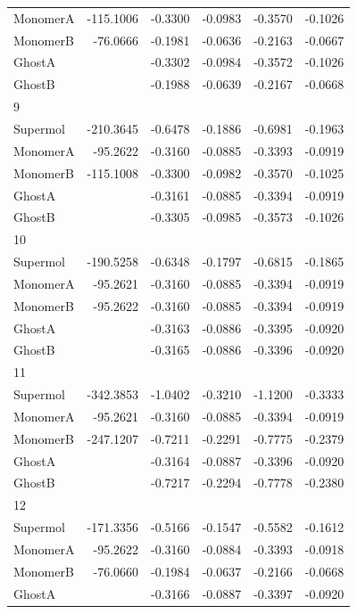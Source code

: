 \documentclass[journal=jctcce,manuscript=article]{achemso}
\begin{document}
\begin{spacing}{1}
\begin{longtable}{lRRRRR}
    MonomerA & -115.1006 & -0.3300 & -0.0983 & -0.3570 & -0.1026 \\
    MonomerB & -76.0666 & -0.1981 & -0.0636 & -0.2163 & -0.0667 \\
    GhostA &  & -0.3302 & -0.0984 & -0.3572 & -0.1026 \\
    GhostB &  & -0.1988 & -0.0639 & -0.2167 & -0.0668 \\
    9 &  &  &  &  &  \\
    Supermol & -210.3645 & -0.6478 & -0.1886 & -0.6981 & -0.1963 \\
    MonomerA & -95.2622 & -0.3160 & -0.0885 & -0.3393 & -0.0919 \\
    MonomerB & -115.1008 & -0.3300 & -0.0982 & -0.3570 & -0.1025 \\
    GhostA &  & -0.3161 & -0.0885 & -0.3394 & -0.0919 \\
    GhostB &  & -0.3305 & -0.0985 & -0.3573 & -0.1026 \\
    10 &  &  &  &  &  \\
    Supermol & -190.5258 & -0.6348 & -0.1797 & -0.6815 & -0.1865 \\
    MonomerA & -95.2621 & -0.3160 & -0.0885 & -0.3394 & -0.0919 \\
    MonomerB & -95.2622 & -0.3160 & -0.0885 & -0.3394 & -0.0919 \\
    GhostA &  & -0.3163 & -0.0886 & -0.3395 & -0.0920 \\
    GhostB &  & -0.3165 & -0.0886 & -0.3396 & -0.0920 \\
    11 &  &  &  &  &  \\
    Supermol & -342.3853 & -1.0402 & -0.3210 & -1.1200 & -0.3333 \\
    MonomerA & -95.2621 & -0.3160 & -0.0885 & -0.3394 & -0.0919 \\
    MonomerB & -247.1207 & -0.7211 & -0.2291 & -0.7775 & -0.2379 \\
    GhostA &  & -0.3164 & -0.0887 & -0.3396 & -0.0920 \\
    GhostB &  & -0.7217 & -0.2294 & -0.7778 & -0.2380 \\
    12 &  &  &  &  &  \\
    Supermol & -171.3356 & -0.5166 & -0.1547 & -0.5582 & -0.1612 \\
    MonomerA & -95.2622 & -0.3160 & -0.0884 & -0.3393 & -0.0918 \\
    MonomerB & -76.0660 & -0.1984 & -0.0637 & -0.2166 & -0.0668 \\
    GhostA &  & -0.3166 & -0.0887 & -0.3397 & -0.0920 \\

\end{longtable}
\end{spacing}
\end{document}
